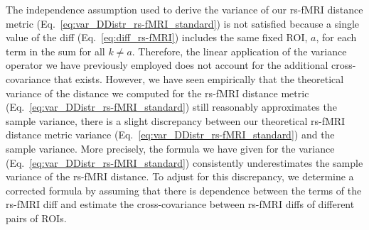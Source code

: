 \documentclass[10pt,letterpaper]{article}
\begin{document}
The independence assumption used to derive the variance of our rs-fMRI distance metric (Eq.~\ref{eq:var_DDistr_rs-fMRI_standard}) is not satisfied because a single value of the diff (Eq.~\ref{eq:diff_rs-fMRI}) includes the same fixed ROI, $a$, for each term in the sum for all $k \neq a$. Therefore, the linear application of the variance operator we have previously employed does not account for the additional cross-covariance that exists. However, we have seen empirically that the theoretical variance of the distance we computed for the rs-fMRI distance metric (Eq.~\ref{eq:var_DDistr_rs-fMRI_standard}) still reasonably approximates the sample variance, there is a slight discrepancy between our theoretical rs-fMRI distance metric variance (Eq.~\ref{eq:var_DDistr_rs-fMRI_standard}) and the sample variance. More precisely, the formula we have given for the variance (Eq.~\ref{eq:var_DDistr_rs-fMRI_standard}) consistently underestimates the sample variance of the rs-fMRI distance. To adjust for this discrepancy, we determine a corrected formula by assuming that there is dependence between the terms of the rs-fMRI diff and estimate the cross-covariance between rs-fMRI diffs of different pairs of ROIs. 
\end{document}

